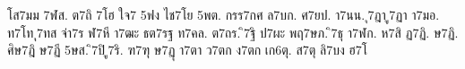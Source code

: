 {โส7มม
7ฬส.
ต7ถิ
7โฮ
ใจ7
5ฟง
ไช7โย
5พต.
กรร7กศ
ล7บก.
ศ7ยป.
า7นน.
ุ7ฎา
ู7ฏา
า7มอ.
ท7โท
ุ7ทส
จ่า7ร
ฬ7หี
า7ฒะ
ธต7รฐ
ท7คล.
ต7ถร.
ิ7ฐิ
ป7ผะ
พฤ7ษภ.
ิ7ธุ
า7ฬก.
ห7สิ
ฏ7ฏิ.
ษ7ฏิ.
ศิษ7ฎิ
ษ7ฏี
5ษส.
ิ7ปิ
ู7ริ.
ฑ7ฑุ
ษ7ฏุ
า7ตา
ว7ตก
ง7ตก
เก6ตุ.
ส7ตุ
ลิ7บง
ฮ7โ
}
